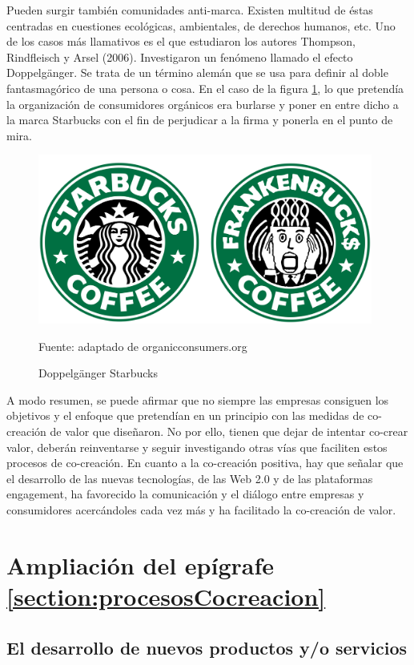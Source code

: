 Pueden surgir también comunidades anti-marca. Existen multitud de éstas centradas en cuestiones ecológicas, ambientales, de derechos humanos, etc. Uno de los casos más llamativos es el que estudiaron los autores Thompson, Rindfleisch y Arsel (2006). Investigaron un fenómeno llamado el efecto Doppelgänger. Se trata de un término alemán que se usa para definir al doble fantasmagórico de una persona o cosa. En el caso de la figura \ref{fig:Starbucks}, lo que pretendía la organización de consumidores orgánicos era burlarse y poner en entre dicho a la marca Starbucks con el fin de perjudicar a la firma y ponerla en el punto de mira.

\begin{figure}[!h]
	\caption{Doppelgänger Starbucks}
	\centering \includegraphics[width=110mm]{capitulos/graficos/Starbucks}
	\label{fig:Starbucks}

		\footnotesize
		Fuente: adaptado de organicconsumers.org
\end{figure}

A modo resumen, se puede afirmar que no siempre las empresas consiguen los objetivos y el enfoque que pretendían en un principio con las medidas de co-creación de valor que diseñaron. No por ello, tienen que dejar de intentar co-crear valor, deberán reinventarse y seguir investigando otras vías que faciliten estos procesos de co-creación. En cuanto a la co-creación positiva, hay que señalar que el desarrollo de las nuevas tecnologías, de las Web 2.0 y de las plataformas engagement, ha favorecido la comunicación y el diálogo entre empresas y consumidores acercándoles cada vez más y ha facilitado la co-creación de valor.

\chapter{Ampliación del epígrafe \ref{section:procesosCocreacion}}
\label{anexo:3}

\section{El desarrollo de nuevos productos y/o servicios}
